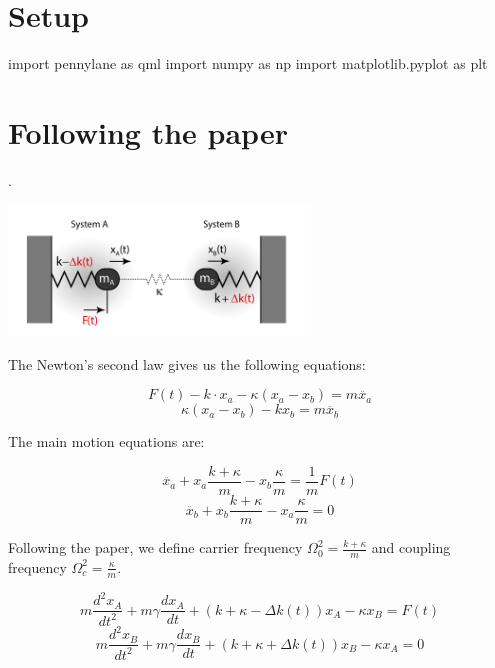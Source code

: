 \section{Setup}


\begin{python}
import pennylane as qml
import numpy as np
import matplotlib.pyplot as plt
\end{python}

\newpage

\section{Following the paper}

.

\begin{center}
  \includegraphics[width=0.6\textwidth]{img/osc.png}
\end{center}

The Newton's second law gives us the following equations:

\[
  F(t) - k \cdot x_a - \kappa(x_a - x_b) = m \ddot{x_a}
\]
\[
  \kappa(x_a - x_b) - k x_b = m \ddot{x_b}
\]

The main motion equations are:

\[
  \ddot{x_a} + x_a\frac{k + \kappa}{m} - x_b\frac{\kappa}{m} = \frac{1}{m}F(t)
\]
\[
  \ddot{x_b} + x_b\frac{k + \kappa}{m} - x_a\frac{\kappa}{m} = 0
\]

Following the paper, we define carrier frequency $\Omega_0^2 = \frac{k+\kappa}{m}$ and coupling
frequency $\Omega_c^2 = \frac{\kappa}{m}$.

\[
  m \frac{d^2x_A}{dt^2} + m \gamma \frac{dx_A}{dt} + \left(k + \kappa - \Delta
k(t)\right)x_A
  - \kappa x_B = F(t)
\]
\[
  m \frac{d^2x_B}{dt^2} + m \gamma \frac{dx_B}{dt} + \left(k + \kappa + \Delta
k(t)\right)x_B
  - \kappa x_A = 0
\]

